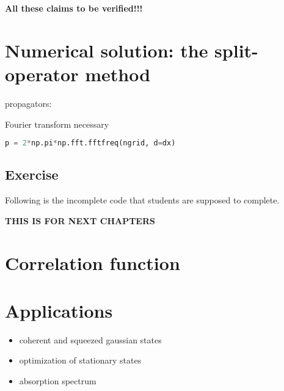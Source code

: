\textbf{All these claims to be verified!!!}


\section{Numerical solution: the split-operator method}

propagators:

Fourier transform necessary
\begin{lstlisting}[language=Python, style=mystyle2]
p = 2*np.pi*np.fft.fftfreq(ngrid, d=dx)
\end{lstlisting}

\subsection{Exercise}

Following is the incomplete code that students are supposed to complete.

\lstset{style=mystyle}





\clearpage
\textbf{THIS IS FOR NEXT CHAPTERS}
\section{Correlation function}



\section{Applications}

\begin{itemize}
    \item coherent and squeezed gaussian states
    \item optimization of stationary states
    \item absorption spectrum
\end{itemize}



